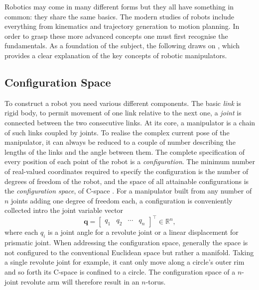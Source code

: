 
Robotics may come in many different forms but they all have something in
common: they share the same basics. The modern studies of robots include
everything from kinematics and trajectory generation to motion planning. In
order to grasp these more advanced concepts one must first recognise the
fundamentals. As a foundation of the subject, the following draws on
\cite{lynch2017modern}, which provides a clear explanation of the key concepts
of robotic manipulators.

\subsection{Configuration Space}
To construct a robot you need various different components. The basic \textit{link} is rigid body, to permit movement of one link relative to the next one, a \textit{joint} is connected between the two consecutive links. At its core, a manipulator is a chain of such links coupled by joints. To realise the complex current pose of the manipulator, it can always be reduced to a couple of number describing the lengths of the links and the angle between them.
The complete specification of every position of each point of the robot is a \textit{configuration}. The minimum number of real-valued coordinates required to specify the configuration is the number of degrees of freedom of the robot, and the space of all attainable configurations is the \textit{configuration space}, of C-space \cite{lynch2017modern}. For a manipulator built from any number of $n$ joints adding one degree of freedom each, a configuration is conveniently collected intro the joint variable vector
\begin{equation}
    \mathbf{q} = \begin{bmatrix} q_1 & q_2 & \cdots & q_n \end{bmatrix}^\top \in \mathbb{R}^n,
\end{equation}
where each $q_i$ is a joint angle for a revolute joint or a linear displacement for prismatic joint.
When addressing the configuration space, generally the space is not configured to the conventional Euclidean space but rather a manifold. Taking a single revolute joint for example, it cant only move along a circle's outer rim and so forth its C-space is confined to a circle. The configuration space of a $n$-joint revolute arm will therefore result in an $n$-torus.

